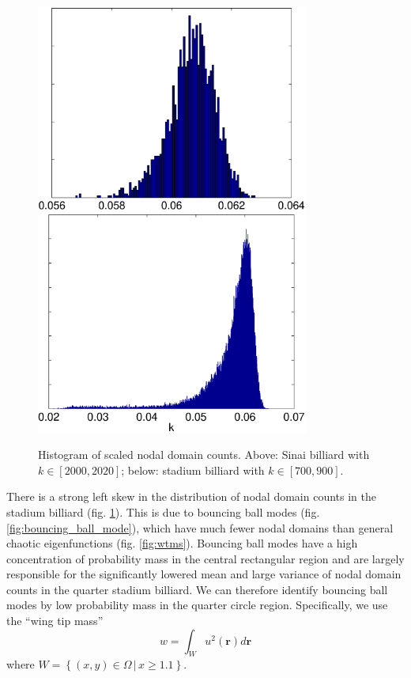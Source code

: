 \documentclass{report}
\newcommand{\rr}[0]{\mathbf{r}}
\begin{document}
\begin{figure}
  \begin{center}
    \includegraphics[width=0.8\textwidth]{figs/results/qugrs_2000_to_2020_count_histogram.eps}
    \linebreak
    \includegraphics[width=0.8\textwidth]{figs/results/qust_700_to_900_count_histogram.eps}
    \caption{Histogram of scaled nodal domain counts. Above: Sinai billiard with $k \in [2000, 2020]$; below: stadium billiard with $k \in [700, 900]$.}
    \label{fig:histograms}
  \end{center}
\end{figure}

There is a strong left skew in the distribution of nodal domain counts in the stadium billiard (fig. \ref{fig:histograms}). This is due to bouncing ball modes (fig. \ref{fig:bouncing_ball_mode}), which have much fewer nodal domains than general chaotic eigenfunctions (fig. \ref{fig:wtms}). Bouncing ball modes have a high concentration of probability mass in the central rectangular region and are largely responsible for the significantly lowered mean and large variance of nodal domain counts in the quarter stadium billiard. We can therefore identify bouncing ball modes by low probability mass in the quarter circle region. Specifically, we use the ``wing tip mass''
\[
w = \int_{W} u^{2}(\rr) d\rr
\]
where $W = \left\{ (x,y) \in \Omega \, \vert \, x \ge 1.1 \right\} $.
\end{document}
